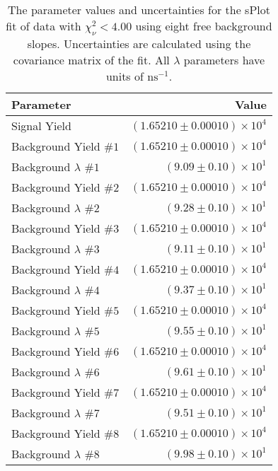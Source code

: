 
\begin{table}[ht]
    \begin{center}
        \begin{tabular}{lr}\toprule
            Parameter & Value \\\midrule
            Signal Yield & $(1.65210 \pm 0.00010) \times 10^{4}$ \\
            Background Yield $\#1$ & $(1.65210 \pm 0.00010) \times 10^{4}$ \\
            Background $\lambda$ $\#1$ & $(9.09 \pm 0.10) \times 10^{1}$ \\
            Background Yield $\#2$ & $(1.65210 \pm 0.00010) \times 10^{4}$ \\
            Background $\lambda$ $\#2$ & $(9.28 \pm 0.10) \times 10^{1}$ \\
            Background Yield $\#3$ & $(1.65210 \pm 0.00010) \times 10^{4}$ \\
            Background $\lambda$ $\#3$ & $(9.11 \pm 0.10) \times 10^{1}$ \\
            Background Yield $\#4$ & $(1.65210 \pm 0.00010) \times 10^{4}$ \\
            Background $\lambda$ $\#4$ & $(9.37 \pm 0.10) \times 10^{1}$ \\
            Background Yield $\#5$ & $(1.65210 \pm 0.00010) \times 10^{4}$ \\
            Background $\lambda$ $\#5$ & $(9.55 \pm 0.10) \times 10^{1}$ \\
            Background Yield $\#6$ & $(1.65210 \pm 0.00010) \times 10^{4}$ \\
            Background $\lambda$ $\#6$ & $(9.61 \pm 0.10) \times 10^{1}$ \\
            Background Yield $\#7$ & $(1.65210 \pm 0.00010) \times 10^{4}$ \\
            Background $\lambda$ $\#7$ & $(9.51 \pm 0.10) \times 10^{1}$ \\
            Background Yield $\#8$ & $(1.65210 \pm 0.00010) \times 10^{4}$ \\
            Background $\lambda$ $\#8$ & $(9.98 \pm 0.10) \times 10^{1}$ \\\bottomrule
        \end{tabular}
        \caption{The parameter values and uncertainties for the sPlot fit of data with $\chi^2_\nu < 4.00$ using eight free background slopes. Uncertainties are calculated using the covariance matrix of the fit. All $\lambda$ parameters have units of $\si{\nano\second}^{-1}$.}\label{tab:splot-fit-results-chisqdof-4.00-free-8}
    \end{center}
\end{table}
